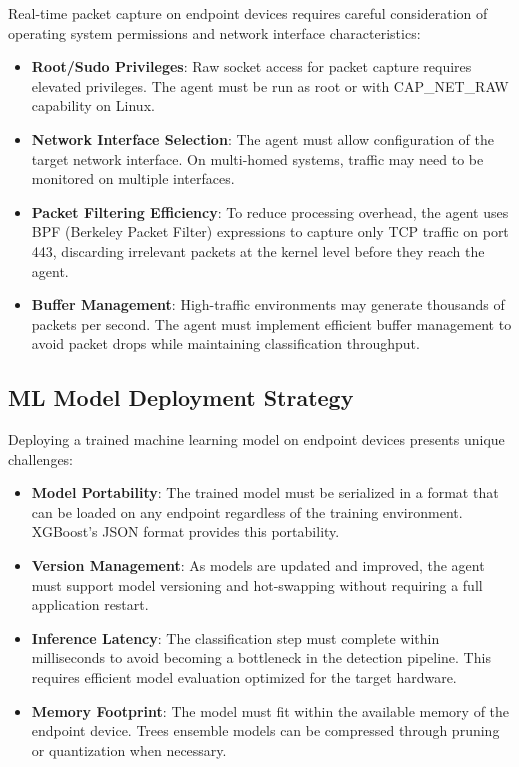 \documentclass[../Main.tex]{subfiles}
\begin{document}
Real-time packet capture on endpoint devices requires careful consideration of operating system permissions and network interface characteristics:

\begin{itemize}
    \item \textbf{Root/Sudo Privileges}: Raw socket access for packet capture requires elevated privileges. The agent must be run as root or with CAP\_NET\_RAW capability on Linux.
    \item \textbf{Network Interface Selection}: The agent must allow configuration of the target network interface. On multi-homed systems, traffic may need to be monitored on multiple interfaces.
    \item \textbf{Packet Filtering Efficiency}: To reduce processing overhead, the agent uses BPF (Berkeley Packet Filter) expressions to capture only TCP traffic on port 443, discarding irrelevant packets at the kernel level before they reach the agent.
    \item \textbf{Buffer Management}: High-traffic environments may generate thousands of packets per second. The agent must implement efficient buffer management to avoid packet drops while maintaining classification throughput.
\end{itemize}

\subsection{ML Model Deployment Strategy}

Deploying a trained machine learning model on endpoint devices presents unique challenges:

\begin{itemize}
    \item \textbf{Model Portability}: The trained model must be serialized in a format that can be loaded on any endpoint regardless of the training environment. XGBoost's JSON format provides this portability.
    \item \textbf{Version Management}: As models are updated and improved, the agent must support model versioning and hot-swapping without requiring a full application restart.
    \item \textbf{Inference Latency}: The classification step must complete within milliseconds to avoid becoming a bottleneck in the detection pipeline. This requires efficient model evaluation optimized for the target hardware.
    \item \textbf{Memory Footprint}: The model must fit within the available memory of the endpoint device. Trees ensemble models can be compressed through pruning or quantization when necessary.
\end{itemize}
\end{document}
